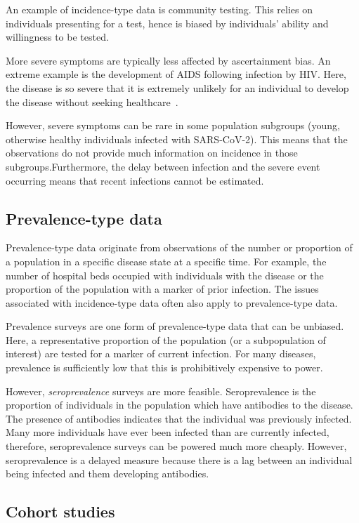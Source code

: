 \documentclass[thesis.tex]{subfiles}
\begin{document}
An example of incidence-type data is community testing.
This relies on individuals presenting for a test, hence is biased by individuals' ability and willingness to be tested.

More severe symptoms are typically less affected by ascertainment bias.
An extreme example is the development of AIDS following infection by HIV.
Here, the disease is so severe that it is extremely unlikely for an individual to develop the disease without seeking healthcare~\autocite{evansCompleteness}.

However, severe symptoms can be rare in some population subgroups (\eg young, otherwise healthy individuals infected with SARS-CoV-2).
This means that the observations do not provide much information on incidence in those subgroups.Furthermore, the delay between infection and the severe event occurring means that recent infections cannot be estimated.

\subsection{Prevalence-type data}

Prevalence-type data originate from observations of the number or proportion of a population in a specific disease state at a specific time.
For example, the number of hospital beds occupied with individuals with the disease or the proportion of the population with a marker of prior infection.
The issues associated with incidence-type data often also apply to prevalence-type data.

Prevalence surveys are one form of prevalence-type data that can be unbiased.
Here, a representative proportion of the population (or a subpopulation of interest) are tested for a marker of current infection.
For many diseases, prevalence is sufficiently low that this is prohibitively expensive to power.

However, \emph{seroprevalence} surveys are more feasible.
Seroprevalence is the proportion of individuals in the population which have antibodies to the disease.
The presence of antibodies indicates that the individual was previously infected.
Many more individuals have ever been infected than are currently infected, therefore, seroprevalence surveys can be powered much more cheaply.
However, seroprevalence is a delayed measure because there is a lag between an individual being infected and them developing antibodies.

\subsection{Cohort studies}
\end{document}
